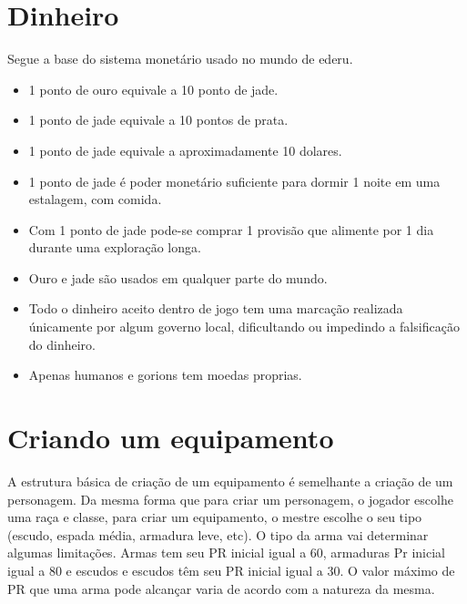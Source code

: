 \section{Dinheiro}
Segue a base do sistema monetário usado no mundo de ederu.
\begin{itemize}
	\item 1 ponto de ouro equivale a 10 ponto de jade.
	\item 1 ponto de jade equivale a 10 pontos de prata.
	\item 1 ponto de jade equivale a aproximadamente 10 dolares.
	\item 1 ponto de jade é poder monetário suficiente para dormir 1 noite em uma estalagem, com comida.
	\item Com 1 ponto de jade pode-se comprar 1 provisão que alimente por 1 dia durante uma exploração longa.	
	\item Ouro e jade são usados em qualquer parte do mundo.
	\item Todo o dinheiro aceito dentro de jogo tem uma marcação realizada únicamente por algum governo local, dificultando ou impedindo a falsificação do dinheiro.
		\item Apenas humanos e gorions tem moedas proprias.
	
\end{itemize}

\section{Criando um equipamento}


A estrutura básica de criação de um equipamento é semelhante a criação de um personagem. Da mesma forma que para criar um personagem, o jogador escolhe uma raça e classe, para criar um equipamento, o mestre escolhe o seu tipo (escudo, espada média, armadura leve, etc). O tipo da arma vai determinar algumas limitações. Armas tem seu PR inicial igual a 60, armaduras Pr inicial igual a 80 e escudos e escudos têm seu PR inicial igual a 30. O valor máximo de PR que uma arma pode alcançar varia de acordo com a natureza da mesma.


